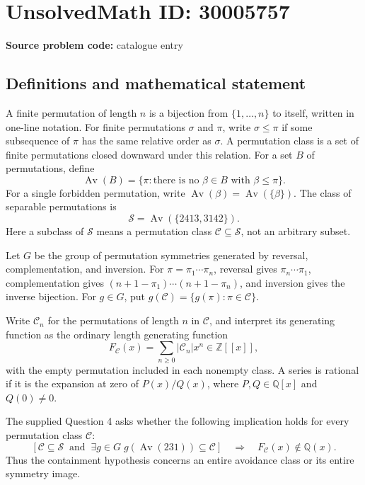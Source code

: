 \documentclass[11pt]{article}
\newcommand{\Z}{\mathbb{Z}}
\newcommand{\Q}{\mathbb{Q}}
\begin{document}
\section*{UnsolvedMath ID: 30005757}
\textbf{Source problem code:} catalogue entry
\subsection{Definitions and mathematical statement}
A finite permutation of length \(n\) is a bijection from \(\{1,\ldots,n\}\) to itself, written in one-line notation. For finite permutations \(\sigma\) and \(\pi\), write \(\sigma\leq\pi\) if some subsequence of \(\pi\) has the same relative order as \(\sigma\). A permutation class is a set of finite permutations closed downward under this relation. For a set \(B\) of permutations, define
\[
\operatorname{Av}(B)=\{\pi: \text{there is no }\beta\in B\text{ with }\beta\leq\pi\}.
\]
For a single forbidden permutation, write \(\operatorname{Av}(\beta)=\operatorname{Av}(\{\beta\})\). The class of separable permutations is
\[
\mathcal S=\operatorname{Av}(\{2413,3142\}).
\]
Here a subclass of \(\mathcal S\) means a permutation class \(\mathcal C\subseteq\mathcal S\), not an arbitrary subset.

Let \(G\) be the group of permutation symmetries generated by reversal, complementation, and inversion. For \(\pi=\pi_1\cdots\pi_n\), reversal gives \(\pi_n\cdots\pi_1\), complementation gives \((n+1-\pi_1)\cdots(n+1-\pi_n)\), and inversion gives the inverse bijection. For \(g\in G\), put \(g(\mathcal C)=\{g(\pi):\pi\in\mathcal C\}\).

Write \(\mathcal C_n\) for the permutations of length \(n\) in \(\mathcal C\), and interpret its generating function as the ordinary length generating function
\[
F_{\mathcal C}(x)=\sum_{n\geq0}|\mathcal C_n|x^n\in\Z[[x]],
\]
with the empty permutation included in each nonempty class. A series is rational if it is the expansion at zero of \(P(x)/Q(x)\), where \(P,Q\in\Q[x]\) and \(Q(0)\neq0\).

The supplied Question 4 asks whether the following implication holds for every permutation class \(\mathcal C\):
\[
\left[\mathcal C\subseteq\mathcal S\ \text{ and }\ \exists g\in G\; g(\operatorname{Av}(231))\subseteq\mathcal C\right]
\quad\Longrightarrow\quad
F_{\mathcal C}(x)\notin\Q(x).
\]
Thus the containment hypothesis concerns an entire avoidance class or its entire symmetry image.
\end{document}
